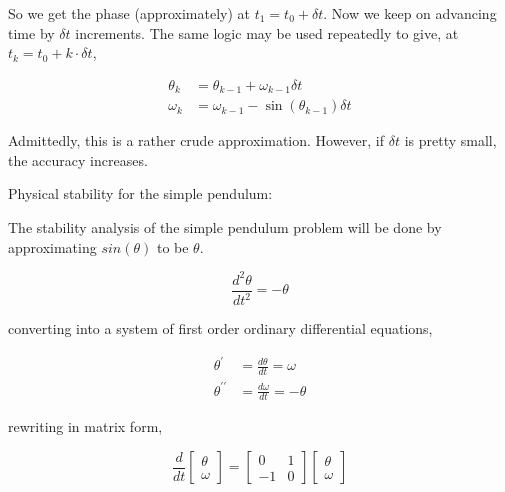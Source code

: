 \documentclass[a4paper,11pt]{report}
\begin{document}
\begin{enumerate}
    So we get the phase (approximately) at $t_1 = t_0 + \delta t$. Now we keep on
    advancing time by $\delta t$ increments. The same logic may be used repeatedly to 
    give, at $t_k = t_0 + k \cdot \delta t$,

    \begin{equation*}
    \begin{aligned}
    \theta_k &= \theta_{k-1} + \omega_{k-1} \delta t \\
    \omega_k &= \omega_{k-1} - \sin(\theta_{k-1}) \delta t
    \end{aligned}
    \end{equation*}

    Admittedly, this is a rather crude approximation. However, if $\delta t$ is pretty
    small, the accuracy increases.

    Physical stability for the simple pendulum:
    
    The stability analysis of the simple pendulum problem will be done by 
    approximating $sin(\theta)$ to be $\theta$.

    \begin{equation*}
    \frac{d^2 \theta}{dt^2} = - \theta
    \end{equation*}

    converting into a system of first order ordinary differential equations,

    \begin{equation*}
    \begin{aligned}
    \theta^{\prime} &= \frac{d \theta}{dt} = \omega \\
    \theta^{\prime\prime} &= \frac{d \omega}{dt} = - \theta
    \end{aligned}
    \end{equation*}

    rewriting in matrix form,
        
    \begin{equation*}
    \frac{d}{dt} \begin{bmatrix} \theta \\ \omega \end{bmatrix} = \begin{bmatrix} 0 & 1 \\ -1 & 0 \end{bmatrix} \begin{bmatrix} \theta \\ \omega \end{bmatrix}
    \end{equation*}


\end{enumerate}
\end{document}
